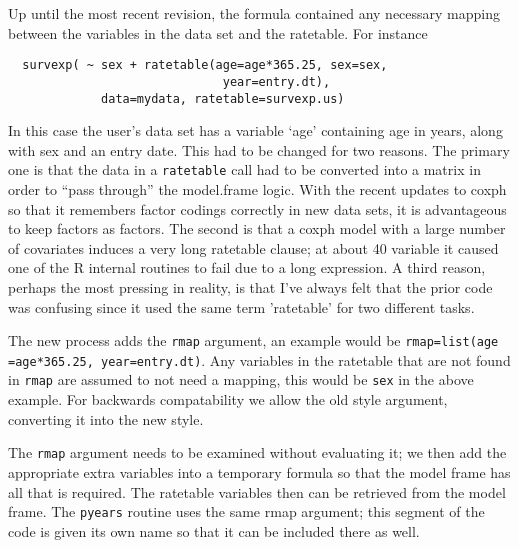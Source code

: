 \documentclass{article}
\begin{document}
Up until the most recent revision, the
formula contained any necessary  mapping between the variables in the data 
set and
the ratetable.  For instance
\begin{verbatim}
  survexp( ~ sex + ratetable(age=age*365.25, sex=sex, 
                              year=entry.dt), 
             data=mydata, ratetable=survexp.us)
\end{verbatim}
In this case the user's data set has a variable `age' containing age in years,
along with sex and an entry date. 
This had to be changed for two reasons.  The primary one is that the data
in a \Verb!ratetable! call had to be converted into a matrix in order to ``pass
through'' the model.frame logic.  With the recent updates to coxph so that it
remembers factor codings correctly in new data sets, it is advantageous to
keep factors as factors.  
The second is that a coxph model with a large number of covariates induces a
very long ratetable clause; at about 40 variable it caused one of the 
R internal
routines to fail due to a long expression.
A third reason, perhaps the most pressing in reality, is that I've always    %
felt that the prior code was confusing since it used the same term 'ratetable'
for two different tasks.

The new process adds the \Verb!rmap! argument, an example would be 
\Verb!rmap=list(age =age*365.25, year=entry.dt)!.
Any variables in the ratetable that are not found in \Verb!rmap! are assumed to
not need a mapping, this would be \Verb!sex! in the above example.
For backwards compatability we allow the old style argument, converting it
into the new style.

The \Verb!rmap! argument needs to be examined without evaluating it; we then add
the appropriate extra variables into a temporary formula so that the model
frame has all that is required.  The ratetable variables then can be
retrieved from the model frame.
The \Verb!pyears! routine uses the same rmap argument; this segment of the
code is given its own name so that it can be included there as well.
\end{document}
